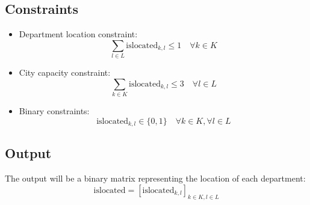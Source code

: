 \documentclass{article}
\begin{document}
\subsection*{Constraints}

\begin{itemize}
    \item Department location constraint:
    \[
    \sum_{l \in L} \text{islocated}_{k,l} \leq 1 \quad \forall k \in K
    \]

    \item City capacity constraint:
    \[
    \sum_{k \in K} \text{islocated}_{k,l} \leq 3 \quad \forall l \in L
    \]

    \item Binary constraints:
    \[
    \text{islocated}_{k,l} \in \{0, 1\} \quad \forall k \in K, \forall l \in L
    \]
\end{itemize}

\subsection*{Output}
The output will be a binary matrix representing the location of each department:
\[
\text{islocated} = \left[ \text{islocated}_{k,l} \right]_{k \in K, l \in L}
\]
\end{document}
